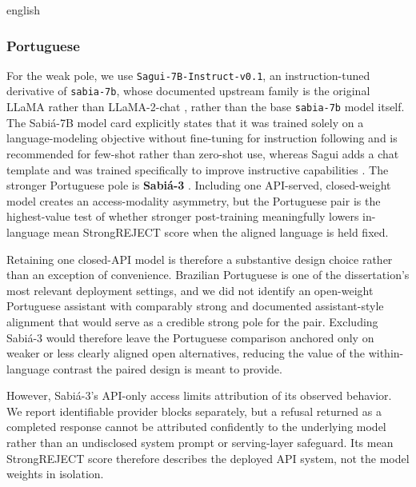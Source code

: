 \begin{otherlanguage*}{english}
\subsubsection{Portuguese}

For the weak pole, we use \texttt{Sagui-7B-Instruct-v0.1}, an instruction-tuned derivative of \texttt{sabia-7b}, whose documented upstream family is the original LLaMA rather than LLaMA-2-chat \cite{maritacaAISabia7b2023}, rather than the base \texttt{sabia-7b} model itself. The Sabiá-7B model card explicitly states that it was trained solely on a language-modeling objective without fine-tuning for instruction following and is recommended for few-shot rather than zero-shot use, whereas Sagui adds a chat template and was trained specifically to improve instructive capabilities \cite{maritacaAISabia7b2023,OliveiraJLT2024Sagui7BInstruct01}. The stronger Portuguese pole is \textbf{Sabiá-3} \cite{abonizioSabia32024}. Including one API-served, closed-weight model creates an access-modality asymmetry, but the Portuguese pair is the highest-value test of whether stronger post-training meaningfully lowers in-language mean StrongREJECT score when the aligned language is held fixed.

Retaining one closed-API model is therefore a substantive design choice rather than an exception of convenience. Brazilian Portuguese is one of the dissertation's most relevant deployment settings, and we did not identify an open-weight Portuguese assistant with comparably strong and documented assistant-style alignment that would serve as a credible strong pole for the pair. Excluding Sabiá-3 would therefore leave the Portuguese comparison anchored only on weaker or less clearly aligned open alternatives, reducing the value of the within-language contrast the paired design is meant to provide.

However, Sabiá-3's API-only access limits attribution of its observed behavior. We report identifiable provider blocks separately, but a refusal returned as a completed response cannot be attributed confidently to the underlying model rather than an undisclosed system prompt or serving-layer safeguard. Its mean StrongREJECT score therefore describes the deployed API system, not the model weights in isolation.



\end{otherlanguage*}
